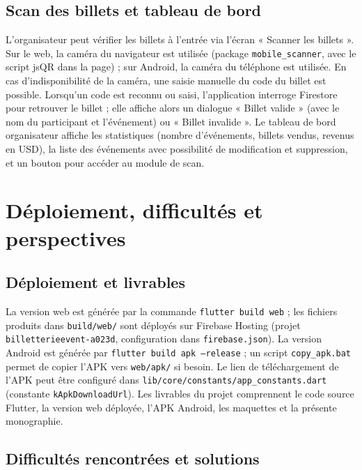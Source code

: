 \documentclass[11pt,a4paper,oneside]{article}
\begin{document}
\subsection{Scan des billets et tableau de bord}

L'organisateur peut vérifier les billets à l'entrée via l'écran « Scanner les billets ». Sur le web, la caméra du navigateur est utilisée (package \texttt{mobile\_scanner}, avec le script jsQR dans la page) ; sur Android, la caméra du téléphone est utilisée. En cas d'indisponibilité de la caméra, une saisie manuelle du code du billet est possible. Lorsqu'un code est reconnu ou saisi, l'application interroge Firestore pour retrouver le billet ; elle affiche alors un dialogue « Billet valide » (avec le nom du participant et l'événement) ou « Billet invalide ». Le tableau de bord organisateur affiche les statistiques (nombre d'événements, billets vendus, revenus en USD), la liste des événements avec possibilité de modification et suppression, et un bouton pour accéder au module de scan.

\section{Déploiement, difficultés et perspectives}
\label{sec:deploiement}

\subsection{Déploiement et livrables}

La version web est générée par la commande \texttt{flutter build web} ; les fichiers produits dans \texttt{build/web/} sont déployés sur Firebase Hosting (projet \texttt{billetterieevent-a023d}, configuration dans \texttt{firebase.json}). La version Android est générée par \texttt{flutter build apk --release} ; un script \texttt{copy\_apk.bat} permet de copier l'APK vers \texttt{web/apk/} si besoin. Le lien de téléchargement de l'APK peut être configuré dans \texttt{lib/core/constants/app\_constants.dart} (constante \texttt{kApkDownloadUrl}). Les livrables du projet comprennent le code source Flutter, la version web déployée, l'APK Android, les maquettes et la présente monographie.

\subsection{Difficultés rencontrées et solutions}
\end{document}
